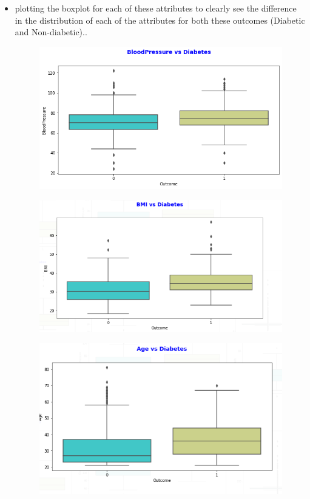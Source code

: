 \documentclass[11pt]{article}
\begin{document}
\begin{itemize}
	\item plotting the boxplot for each of these attributes to clearly see the difference in the distribution of each of the attributes for both these outcomes (Diabetic and Non-diabetic)..\\
	\begin{figure}[h]
		\centerline{\small 
			\includegraphics[height=0.2\textheight]  {bw}}
	\end{figure}
	\begin{figure}[h]
		\centerline{\small 
			\includegraphics[height=0.2\textheight]  {bw2}}
	\end{figure}

	\begin{figure}[h]
		\centerline{\small 
			\includegraphics[height=0.2\textheight]  {bw3}}
	\end{figure}


\end{itemize}
\end{document}
